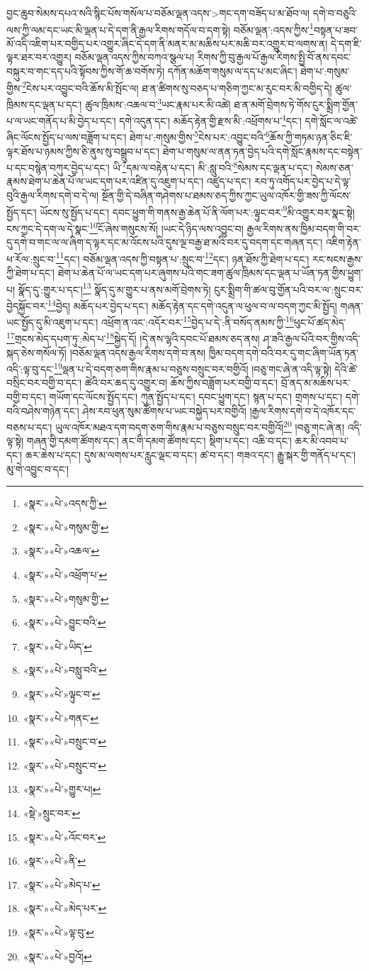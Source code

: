 བྱང་ཆུབ་སེམས་དཔའ་སའི་སྙིང་པོས་གསོལ་པ་བཅོམ་ལྡན་འདས་>གང་དག་བཟོད་པ་མ་ཐོབ་ལ། དགེ་བ་བཅུའི་ལས་ཀྱི་ལམ་དང་ཡང་མི་ལྡན་པ་དེ་དག་ནི་རྒྱལ་རིགས་གདོལ་བ་དག་སྟེ། བཅོམ་ལྡན་:འདས་ཀྱིས་\footnote{«སྣར་»«པེ་»འདས་ཀྱི་}བསྟན་པ་ཟབ་མོ་འདི་འཇིག་པར་བགྱིད་པར་འགྱུར་ཞིང་དེ་དག་ནི་མནར་མ་མཆིས་པར་མཆི་བར་འགྱུར་བ་ལགས་ན། དེ་དག་ཇི་ལྟར་ཐར་བར་འགྱུར། བཅོམ་ལྡན་འདས་ཀྱིས་བཀའ་སྩལ་པ། རིགས་ཀྱི་བུ་རྒྱལ་པོ་རྒྱལ་རིགས་སྤྱི་བོ་ནས་དབང་བསྐུར་བ་གང་དད་པའི་སྟོབས་ཀྱིས་གོ་ཆ་བགོས་ཏེ། དཀོན་མཆོག་གསུམ་ལ་དད་པ་མང་ཞིང་། ཐེག་པ་:གསུམ་གྱིས་\footnote{«སྣར་»«པེ་»གསུམ་གྱི་}ངེས་པར་འབྱུང་བའི་ཆོས་མི་སྤོང་ལ། ཐ་ན་ཚིགས་སུ་བཅད་པ་གཅིག་ཀྱང་མ་རུང་བར་མི་བགྱིད་དེ། ཚུལ་ཁྲིམས་དང་ལྡན་པ་དང་། ཚུལ་ཁྲིམས་:འཆལ་བ་\footnote{«སྣར་»«པེ་»འཆལ་}ཡང་རྣམ་པར་མི་འཚེ། ཐ་ན་མགོ་བྲེགས་ཏེ་གོས་ངུར་སྨྲིག་གྱོན་པ་ལ་ཡང་གནོད་པ་མི་བྱེད་པ་དང་། དགེ་འདུན་དང་། མཆོད་རྟེན་གྱི་རྫས་མི་:འཕྲོགས་པ་\footnote{«སྣར་»«པེ་»འཕྲོག་པ་}དང་། དགེ་སློང་ལ་འཚེ་ཞིང་ལོངས་སྤྱོད་པ་ལས་བཟློག་པ་དང་། ཐེག་པ་:གསུམ་གྱིས་\footnote{«སྣར་»«པེ་»གསུམ་གྱི་}ངེས་པར་:འབྱུང་བའི་\footnote{«སྣར་»«པེ་»བྱུང་བའི་}ཆོས་ཀྱི་གཏམ་ཉན་ཅིང་ཇི་ལྟར་ཐོས་པ་ཉམས་ཀྱིས་ཅི་ནུས་སུ་བསྒྲུབ་པ་དང་། ཐེག་པ་གསུམ་ལ་ནན་ཏན་བྱེད་པའི་དགེ་སློང་རྣམས་དང་བསྟེན་པ་དང་བསྙེན་བཀུར་བྱེད་པ་དང་། ཡི་\footnote{«སྣར་»«པེ་»ཡིད་}དམ་ལ་བརྟེན་པ་དང་། མི་:སླུ་བའི་\footnote{«སྣར་»«པེ་»བསླུ་བའི་}སེམས་དང་ལྡན་པ་དང་། སེམས་ཅན་རྣམས་ཐེག་པ་ཆེན་པོ་ལ་ཡང་དག་པར་འཛིན་དུ་འཇུག་པ་དང་། འཛུད་པ་དང་། རབ་ཏུ་འགོད་པར་བྱེད་པ་དེ་ལྟ་བུའི་རྒྱལ་རིགས་དགེ་བ་དེ་ལ། སྔོན་གྱི་དེ་བཞིན་གཤེགས་པ་ཐམས་ཅད་ཀྱིས་ཀྱང་ཡུལ་འཁོར་གྱི་ཟས་ཀྱི་ལོངས་སྤྱོད་དང་། ཡོངས་སུ་སྤྱོད་པ་དང་། དབང་ཕྱུག་གི་གནས་རྒྱ་ཆེན་པོ་ནི་ལོག་པར་:ལྟུང་བར་\footnote{«སྣར་»«པེ་»ལྟུང་བ་}མི་འགྱུར་བར་སྣང་སྟེ། ངས་ཀྱང་དེ་དག་ལ་དེ་སྣང་\footnote{«སྣར་»«པེ་»གནང་}ངོ་ཞེས་གསུངས་སོ། །ཡང་དེ་ཉིད་ལས་འབྱུང་བ། རྒྱལ་རིགས་ནས་ཁྱིམ་བདག་གི་བར་དུ་དགེ་བ་གང་ལ་ལ་ཞིག་ད་ལྟར་དང་མ་འོངས་པའི་དུས་ལྔ་བརྒྱ་ཐ་མའི་བར་དུ་བདག་དང་གཞན་དང་། འཇིག་རྟེན་ཕ་རོལ་:སྲུང་བ་\footnote{«སྣར་»«པེ་»བསྲུང་བ་}དང་། བཅོམ་ལྡན་འདས་ཀྱི་བསྟན་པ་:སྲུང་བ་\footnote{«སྣར་»«པེ་»བསྲུང་བ་}དང་། ཉན་ཐོས་ཀྱི་ཐེག་པ་དང་། རང་སངས་རྒྱས་ཀྱི་ཐེག་པ་དང་། ཐེག་པ་ཆེན་པོ་ལ་ཡང་དག་པར་ཞུགས་པའི་གང་ཟག་ཚུལ་ཁྲིམས་དང་ལྡན་པ་ཡོན་ཏན་གྱིས་ཕྱུག་པ། སྣོད་དུ་:གྱུར་པ་དང་།\footnote{«སྣར་»«པེ་»གྱུར་པ།} སྣོད་དུ་མ་གྱུར་པ་ནས་མགོ་བྲེགས་ཏེ། ངུར་སྨྲིག་གི་ཚལ་བུ་གྱོན་པའི་བར་ལ་:སྲུང་བར་བྱེདསྐྱོང་བར་\footnote{«སྡེ་»སྲུང་བར་}བྱེད། མཆོད་པར་བྱེད་པ་དང་། མཆོད་རྟེན་དང་དགེ་འདུན་ལ་ཕུལ་བ་ལ་བདག་ཀྱང་མི་སྤྱོད། གཞན་ཡང་སྤྱོད་དུ་མི་འཇུག་པ་དང་། འཕྲོག་ན་འང་:འདོར་བར་\footnote{«སྣར་»«པེ་»འོང་བར་}བྱེད་པ་དེ་:ནི་བསོད་ནམས་ཀྱི་\footnote{«སྣར་»«པེ་»ནི་}ཕུང་པོ་ཚད་མེད་\footnote{«སྣར་»«པེ་»མེད་པ་}གྲངས་མེད་དཔག་ཏུ་:མེད་པ་\footnote{«སྣར་»«པེ་»མེད་པར་}སྐྱེད་དོ། །དེ་ནས་ལྷའི་དབང་པོ་ཐམས་ཅད་ནས། ཤ་ཟའི་རྒྱལ་པོའི་བར་གྱིས་འདི་སྐད་ཅེས་གསོལ་ཏོ། །བཅོམ་ལྡན་འདས་རྒྱལ་རིགས་དགེ་བ་ནས། ཁྱིམ་བདག་དགེ་བའི་བར་དུ་གང་ཞིག་ཡོན་ཏན་འདི་:ལྟ་བུ་དང་\footnote{«སྣར་»«པེ་»ལྟ་བུ་}ལྡན་པ་དེ་བདག་ཅག་གིས་རྣམ་པ་བཅུས་བསྲུང་བར་བགྱིའོ། །བཅུ་གང་ཞེ་ན་འདི་ལྟ་སྟེ། དེའི་ཚེ་བསྲིང་བར་བགྱི་བ་དང་། ཚེའི་བར་ཆད་དུ་འགྱུར་བ། ཆོས་ཀྱིས་བཟློག་པར་བགྱི་བ་དང་། བྲོ་ནད་མ་མཆིས་པར་བགྱི་བ་དང་། གཡོག་དང་ལོངས་སྤྱོད་དང་། ཀུན་སྤྱོད་པ་དང་། དབང་ཕྱུག་དང་། སྙན་པ་དང་། གྲགས་པ་དང་། དགེ་བའི་བཤེས་གཉེན་དང་། ཤེས་རབ་ཕུན་སུམ་ཚོགས་པ་ཡང་བསྐྱེད་པར་བགྱིའོ། །རྒྱལ་རིགས་དགེ་བ་དེ་འཁོར་དང་བཅས་པ་དང་། ཡུལ་འཁོར་མཐའ་དག་བདག་ཅག་གིས་རྣམ་པ་བཅུས་བསྲུང་བར་བགྱིའོ།\footnote{«སྣར་»«པེ་»བྱའོ།} །བཅུ་གང་ཞེ་ན། འདི་ལྟ་སྟེ། གཞན་གྱི་དམག་ཚོགས་དང་། ནང་གི་དམག་ཚོགས་དང་། སྡིག་པ་དང་། འཆི་བ་དང་། ཆར་མི་འབབ་པ་དང་། ཆར་ཆེས་པ་དང་། དུས་མ་ལགས་པར་རླུང་ལྡང་བ་དང་། ཚ་བ་དང་། གཟའ་དང་། རྒྱུ་སྐར་གྱི་གནོད་པ་དང་། མུ་གེ་འབྱུང་བ་དང་། 